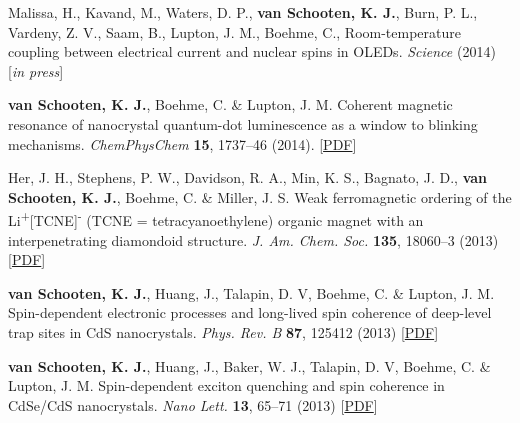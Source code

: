 \documentclass[11pt,letterpaper]{article}
\newcommand{\mhead}[1]{\leavevmode\marginpar{\sffamily\small #1}}
\begin{document}
\mhead{Refereed\newline Journal\newline Publications}
\vspace{-1.1em} %
\begin{bibenum}

		\item Malissa, H., Kavand, M., Waters, D. P., \textbf{van Schooten, K. J.}, Burn, P. L., Vardeny, Z. V., Saam, B., Lupton, J. M., Boehme, C., Room-temperature coupling between electrical current and nuclear spins in OLEDs. \textit{Science} (2014) [\textit{in press}]

		\item \textbf{van Schooten, K. J.}, Boehme, C. \& Lupton, J. M. Coherent magnetic resonance of nanocrystal quantum-dot luminescence as a window to blinking mechanisms. \textit{ChemPhysChem} \textbf{15}, 1737--46 (2014).  [\href{http://www.physics.utah.edu/~kippvs/papers/2014_ChemPhysChem.pdf}{PDF}]

		\item Her, J. H., Stephens, P. W., Davidson, R. A., Min, K. S., Bagnato, J. D., \textbf{van Schooten, K. J.}, Boehme, C. \& Miller, J. S.	Weak ferromagnetic ordering of the Li\textsuperscript{+}[TCNE]\textsuperscript{\textbullet -} (TCNE = tetracyanoethylene) organic magnet with an interpenetrating diamondoid structure. \textit{J. Am. Chem. Soc.} \textbf{135}, 18060--3 (2013)  [\href{http://www.physics.utah.edu/~kippvs/papers/2013_JACS.pdf}{PDF}]
		
		\item \textbf{van Schooten, K. J.}, Huang, J., Talapin, D. V, Boehme, C. \& Lupton, J. M. Spin-dependent electronic processes and long-lived spin coherence of deep-level trap sites in CdS nanocrystals. \textit{Phys. Rev. B} \textbf{87}, 125412 (2013)  [\href{http://www.physics.utah.edu/~kippvs/papers/2013_PRB.pdf}{PDF}]
		
		\item \textbf{van Schooten, K. J.}, Huang, J., Baker, W. J., Talapin, D. V, Boehme, C. \& Lupton, J. M. Spin-dependent exciton quenching and spin coherence in CdSe/CdS nanocrystals. \textit{Nano Lett.} \textbf{13}, 65--71 (2013)  [\href{http://www.physics.utah.edu/~kippvs/papers/2013_NanoLett.pdf}{PDF}]


\end{bibenum}
\end{document}
